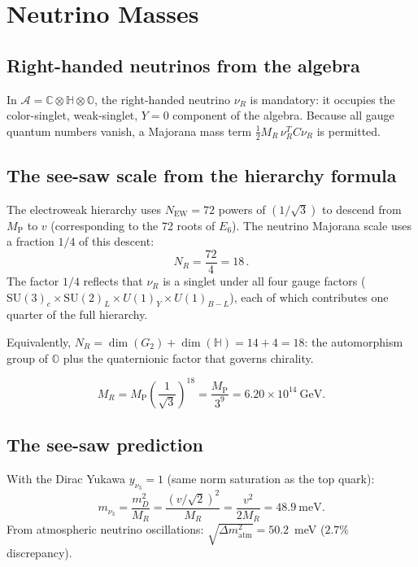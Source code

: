 \documentclass[12pt,a4paper]{article}
\theoremstyle{definition}
\theoremstyle{remark}
\newcommand{\Oct}{\mathbb{O}}
\newcommand{\Quat}{\mathbb{H}}
\newcommand{\Comp}{\mathbb{C}}
\newcommand{\Alg}{\mathcal{A}}
\newcommand{\SU}{\mathrm{SU}}
\newcommand{\MP}{M_{\mathrm{P}}}
\newcommand{\MR}{M_R}
\begin{document}
\section{Neutrino Masses}
\label{sec:neutrinos}

\subsection{Right-handed neutrinos from the algebra}

In $\Alg = \Comp\otimes\Quat\otimes\Oct$, the right-handed neutrino $\nu_R$ 
is mandatory: it occupies the color-singlet, weak-singlet, $Y=0$ component 
of the algebra. Because all gauge quantum numbers vanish, a Majorana mass 
term $\frac{1}{2}\MR\,\nu_R^T C \nu_R$ is permitted.

\subsection{The see-saw scale from the hierarchy formula}

The electroweak hierarchy uses $N_{\text{EW}} = 72$ powers of $(1/\sqrt{3})$ 
to descend from $\MP$ to $v$ (corresponding to the 72 roots of $E_6$). 
The neutrino Majorana scale uses a fraction $1/4$ of this descent:
\begin{equation}
N_R = \frac{72}{4} = 18\,.
\end{equation}
The factor $1/4$ reflects that $\nu_R$ is a singlet under all four gauge factors 
($\SU(3)_c\times\SU(2)_L\times U(1)_Y\times U(1)_{B-L}$), each of which 
contributes one quarter of the full hierarchy.

Equivalently, $N_R = \dim(G_2) + \dim(\Quat) = 14 + 4 = 18$: the automorphism 
group of $\Oct$ plus the quaternionic factor that governs chirality.

\begin{equation}
\MR = \MP\left(\frac{1}{\sqrt{3}}\right)^{18} 
= \frac{\MP}{3^9} = 6.20\times 10^{14}~\text{GeV}.
\end{equation}

\subsection{The see-saw prediction}

With the Dirac Yukawa $y_{\nu_3} = 1$ (same norm saturation as the top quark):
\begin{equation}
m_{\nu_3} = \frac{m_D^2}{\MR} = \frac{(v/\sqrt{2})^2}{\MR} 
= \frac{v^2}{2\MR} = 48.9~\text{meV}.
\end{equation}
From atmospheric neutrino oscillations: 
$\sqrt{\Delta m^2_{\text{atm}}} = 50.2$~meV ($2.7\%$ discrepancy).
\end{document}
